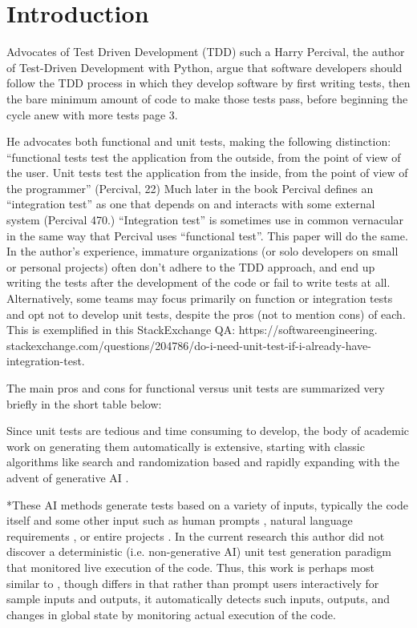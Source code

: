 \section{Introduction}\label{sec:introduction}
Advocates of Test Driven Development (TDD) such a Harry Percival, 
the author of Test-Driven Development with Python, 
argue that software developers should follow the TDD process in 
which they develop software by first writing tests, 
then the bare minimum amount of code to make those tests pass, 
before beginning the cycle anew with more tests \cite{percival2014test} page 3.   

%
He advocates both functional and unit tests, making the following distinction: 
“functional tests test the application from the outside, from the point of view of the user.
%
Unit tests test the application from the inside, 
from the point of view of the programmer” (Percival, 22)
%
Much later in the book Percival defines an “integration test” as 
one that depends on and interacts with some external system (Percival 470.)  
%
“Integration test” is sometimes use in common vernacular in the same way that Percival uses “functional test”.  
%
This paper will do the same.
%
In the author’s experience, immature organizations (or solo developers
on small or personal projects) often don’t adhere to the TDD approach,
and end up writing the tests after the development of the code or 
fail to write tests at all.
%
Alternatively, some teams may focus primarily on function or integration tests 
 and opt not to develop unit tests, despite the pros (not to mention cons) of each.
%
This is exemplified in this StackExchange QA: https://softwareengineering.
%
stackexchange.com/questions/204786/do-i-need-unit-test-if-i-already-have-integration-test.
%
  

The main pros and cons for functional versus unit tests are summarized very briefly in the short table below:

Since unit tests are tedious and time consuming to develop, the body of academic work on generating them automatically is extensive, starting with classic algorithms like search and randomization based \cite{Luk22Pynguin0170} and rapidly expanding with the advent of generative AI \cite{bhatia2023unit,takerngsaksiri2024tdd,wang2024software}.  

*These AI methods generate tests based on a variety of inputs, typically the code itself and some other input such as human prompts \cite{lahiri2022interactive}, natural language requirements \cite{wang2024software}, or entire projects \cite{rao2023cat}.  
%
In the current research this author did not discover a deterministic (i.e. non-generative AI) unit test generation paradigm that monitored live execution of the code.
%
Thus, this work is perhaps most similar to \cite{lahiri2022interactive}, though differs in that rather than prompt users interactively for sample inputs and outputs, it automatically detects such inputs, outputs, and changes in global state by monitoring actual execution of the code.
%

%

